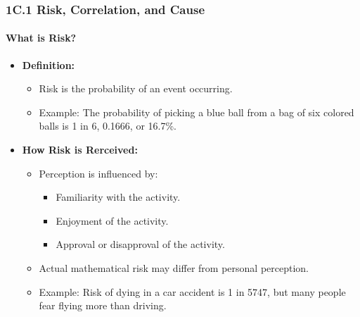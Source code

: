 
\subsubsection{1C.1 Risk, Correlation, and Cause}
\paragraph{What is Risk?}
\begin{itemize}
    \item \textbf{Definition:}
    \begin{itemize}
        \item Risk is the probability of an event occurring.
        \item Example: The probability of picking a blue ball from a bag of six colored balls is 1 in 6, 0.1666, or 16.7\%.
    \end{itemize}
    \item \textbf{How Risk is Rerceived:}
    \begin{itemize}
        \item Perception is influenced by:
        \begin{itemize}
            \item Familiarity with the activity.
            \item Enjoyment of the activity.
            \item Approval or disapproval of the activity.
        \end{itemize}
        \item Actual mathematical risk may differ from personal perception.
        \item Example: Risk of dying in a car accident is 1 in 5747, but many people fear flying more than driving.
    \end{itemize}
\end{itemize}

